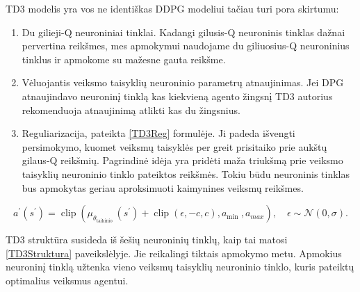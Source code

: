 \documentclass[a4paper, 12pt]{article}
\begin{document}
TD3\cite{TD3} modelis yra vos ne identiškas DDPG modeliui tačiau turi pora skirtumu:

\begin{enumerate}
  \addtolength{\itemsep}{-0.5\baselineskip} 
  \item Du gilieji-Q neuroniniai tinklai. Kadangi gilusis-Q neuroninis tinklas dažnai pervertina reikšmes, mes apmokymui naudojame du giliuosius-Q neuroninius tinklus ir apmokome su mažesne gauta reikšme.
  \item Vėluojantis veiksmo taisyklių neuroninio parametrų atnaujinimas. Jei DPG atnaujindavo neuroninį tinklą kas kiekvieną agento žingsnį TD3 autorius rekomenduoja atnaujinimą atlikti kas du žingsnius. 
  \item Reguliarizacija, pateikta \ref{TD3Reg} formulėje. Ji padeda išvengti persimokymo, kuomet veiksmų taisyklės per greit prisitaiko prie aukštų gilaus-Q reikšmių. Pagrindinė idėja yra pridėti maža triukšmą prie veiksmo taisyklių neuroninio tinklo pateiktos reikšmės. Tokiu būdu neuroninis tinklas bus apmokytas geriau aproksimuoti kaimynines veiksmų reikšmes.
\end{enumerate}

\begin{equation}
\label{TD3Reg}
a^{\prime}\left(s^{\prime}\right)=\operatorname{clip}\left(\mu_{\theta_{\text {taikinio }}}\left(s^{\prime}\right)+\operatorname{clip}(\epsilon,-c, c), a_{\text {min }}, a_{max}\right), \quad \epsilon \sim \mathcal{N}(0, \sigma).
\end{equation}

TD3 struktūra susideda iš šešių neuroninių tinklų, kaip tai matosi \ref{TD3Struktura} paveikslėlyje. Jie reikalingi tiktais apmokymo metu. Apmokius neuroninį tinklą užtenka vieno veiksmų taisyklių neuroninio tinklo, kuris pateiktų optimalius veiksmus agentui.
\end{document}
